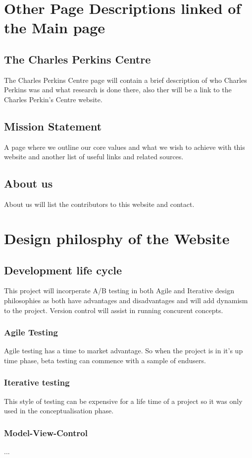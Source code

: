 \documentclass[letterpaper,12pt]{article}
\begin{document}
\section{Other Page Descriptions linked of the Main page}
\subsection{The Charles Perkins Centre}

The Charles Perkins Centre page will contain a brief description of who Charles Perkins was and what research is done there, also ther will be a link to the Charles Perkin's Centre website.

\subsection{Mission Statement} 

A page where we outline our core values and what we wish to achieve with this website and another list of useful links and related sources.


\subsection{About us}

About us will list the contributors to this website and contact.

\section{Design philosphy of the Website}

\subsection{Development life cycle}

This project will incorperate A/B testing in both Agile and Iterative design philosophies as both have advantages and disadvantages and will add dynamism to the project. Version control will assist in running concurent concepts. 

\subsubsection{Agile Testing}

Agile testing has a time to market advantage. So when the project is in it's up time phase, beta testing can commence with a sample of endusers.

\subsubsection{Iterative testing}

This style of testing can be expensive for a life time of a project so it was only used in the conceptualisation phase.

\subsubsection{Model-View-Control}
...


\end{document}
